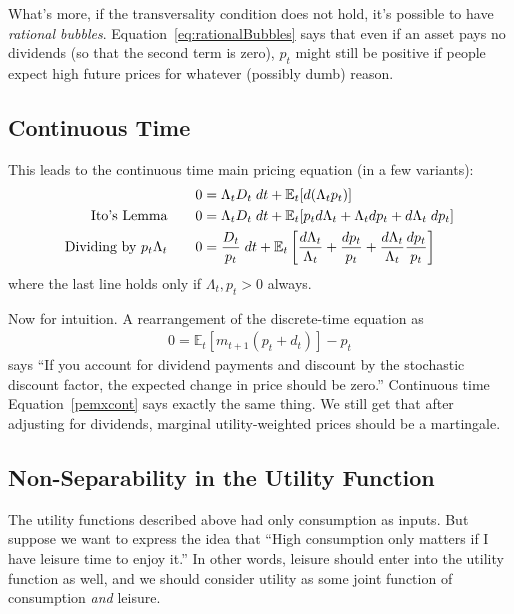 \documentclass[12pt]{article}
\theoremstyle{plain}
\theoremstyle{definition}
\theoremstyle{remark}
\begin{document}
What's more, if the transversality condition does not hold, it's
possible to have \emph{rational bubbles}.
Equation~\ref{eq:rationalBubbles} says that even if an asset pays no
dividends (so that the second term is zero), $p_t$ might still be
positive if people expect high future prices for whatever (possibly
dumb) reason.

\subsection{Continuous Time}


This leads to the continuous time main pricing equation (in a few
variants):
\begin{align}
  0 &= \Lambda_t D_t \; dt + \mathbb{E}_t[d(\Lambda_t p_t)]
  \label{pemxcont}\\
  \text{Ito's Lemma}\qquad
  0 &= \Lambda_t D_t \; dt
  + \mathbb{E}_t[p_t d\Lambda_t + \Lambda_t dp_t + d\Lambda_t\; dp_t]
  \notag\\
  \text{Dividing by $p_t\Lambda_t$}\qquad
  0 &= \frac{D_t}{p_t} \; dt
  + \mathbb{E}_t\left[\frac{d\Lambda_t}{\Lambda_t}
  + \frac{dp_t}{p_t} + \frac{d\Lambda_t}{\Lambda_t}\frac{dp_t}{p_t}
  \right]
  \notag
\end{align}
where the last line holds only if $\Lambda_t,p_t>0$ always.

Now for intuition. A rearrangement of the discrete-time equation as
\begin{align*}
  0=\mathbb{E}_t[m_{t+1}(p_t+d_t)]-p_t
\end{align*}
says ``If you account for dividend payments and discount by the
stochastic discount factor, the expected change in price should be
zero.'' Continuous time Equation~\ref{pemxcont} says exactly the same
thing.  We still get that after adjusting for dividends, marginal
utility-weighted prices should be a martingale.


\subsection{Non-Separability in the Utility Function}

The utility functions described above had only consumption as inputs.
But suppose we want to express the idea that ``High consumption only
matters if I have leisure time to enjoy it.'' In other words, leisure
should enter into the utility function as well, and we should consider
utility as some joint function of consumption \emph{and} leisure.
\end{document}
